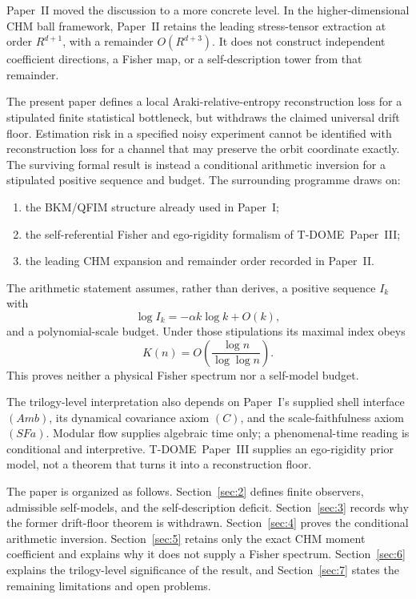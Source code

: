\documentclass[12pt]{article}
\theoremstyle{definition}
\theoremstyle{remark}
\begin{document}
Paper~II\cite{PaperII} moved the discussion to a more concrete level.
In the higher-dimensional CHM ball framework, Paper~II retains the
leading stress-tensor extraction at order \(R^{d+1}\), with a remainder
\(O(R^{d+3})\). It does not construct independent coefficient
directions, a Fisher map, or a self-description tower from that
remainder.

The present paper defines a local Araki-relative-entropy reconstruction
loss for a stipulated finite statistical bottleneck, but withdraws the
claimed universal drift floor. Estimation risk in a specified noisy
experiment cannot be identified with reconstruction loss for a channel
that may preserve the orbit coordinate exactly. The surviving formal
result is instead a conditional arithmetic inversion for a stipulated
positive sequence and budget. The surrounding programme draws on:
\begin{enumerate}
\item the BKM/QFIM structure already used in Paper~I\cite{PaperI};
\item the self-referential Fisher and ego-rigidity formalism of
T-DOME~Paper~III\cite{TDOMEIII};
\item the leading CHM expansion and remainder order recorded in
Paper~II\cite{PaperII}.
\end{enumerate}

The arithmetic statement assumes, rather than derives, a positive
sequence \(I_k\) with
\[
\log I_k = -\alpha k\log k + O(k),
\]
and a polynomial-scale budget. Under those stipulations its maximal
index obeys
\[
K(n)=O\!\left(\frac{\log n}{\log\log n}\right).
\]
This proves neither a physical Fisher spectrum nor a self-model budget.

The trilogy-level interpretation also depends on Paper~I's supplied
shell interface \((Amb)\), its dynamical covariance axiom \((C)\), and
the scale-faithfulness axiom \((SFa)\). Modular flow supplies algebraic
time only; a phenomenal-time reading is conditional and interpretive.
T-DOME~Paper~III supplies an ego-rigidity prior model, not a theorem that
turns it into a reconstruction floor.

The paper is organized as follows. Section~\ref{sec:2} defines finite
observers, admissible self-models, and the self-description deficit.
Section~\ref{sec:3} records why the former drift-floor theorem is
withdrawn. Section~\ref{sec:4} proves the conditional arithmetic
inversion. Section~\ref{sec:5} retains only the exact CHM moment
coefficient and explains why it does not supply a Fisher spectrum.
Section~\ref{sec:6}
explains the trilogy-level significance of the result, and
Section~\ref{sec:7} states the remaining limitations and open problems.
\end{document}
